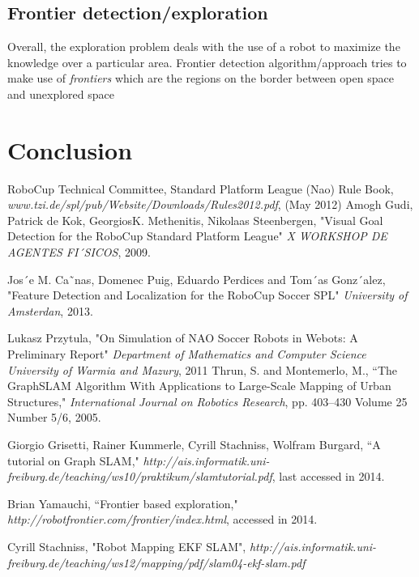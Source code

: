 \documentclass{ba-kecs}
\numberwithin{figure}{section}
\numberwithin{equation}{section}
\begin{document}
\subsection{Frontier detection/exploration}
	Overall, the exploration problem deals with the use of a robot to maximize the knowledge over a particular area. Frontier detection algorithm/approach tries to make use of \textit{frontiers} which are the regions on the border between open space and unexplored space \cite{frontier}


\section{Conclusion}




\begin{thebibliography}{99}

 RoboCup Technical Committee, Standard Platform League (Nao) Rule Book, \emph{www.tzi.de/spl/pub/Website/Downloads/Rules2012.pdf}, (May 2012)
 Amogh Gudi, Patrick de Kok, GeorgiosK. Methenitis, Nikolaas Steenbergen, "Visual Goal Detection for the RoboCup Standard Platform League" \emph{X WORKSHOP DE AGENTES FI´SICOS}, 2009.

 Jos´e M. Ca˜nas, Domenec Puig, Eduardo Perdices and Tom´as Gonz´alez, "Feature Detection and Localization for the
RoboCup Soccer SPL" \emph{University of Amsterdan}, 2013.

 Lukasz Przytula, "On Simulation of NAO Soccer Robots in Webots: A Preliminary Report" \emph{Department of Mathematics and Computer Science University of Warmia and Mazury}, 2011
 Thrun, S. and Montemerlo, M., ``The GraphSLAM Algorithm With Applications to Large-Scale Mapping of Urban Structures," \emph{International Journal on Robotics Research}, pp. 403--430 Volume 25 Number 5/6, 2005.

 Giorgio Grisetti, Rainer Kummerle, Cyrill Stachniss, Wolfram Burgard, ``A tutorial on Graph SLAM," \emph{http://ais.informatik.uni-freiburg.de/teaching/ws10/praktikum/slamtutorial.pdf}, last accessed in 2014.
 
 Brian Yamauchi, ``Frontier based exploration," \emph{http://robotfrontier.com/frontier/index.html}, accessed in 2014. 

 Cyrill Stachniss, "Robot Mapping EKF SLAM", \emph{http://ais.informatik.uni-freiburg.de/teaching/ws12/mapping/pdf/slam04-ekf-slam.pdf }


\end{thebibliography}
\end{document}
